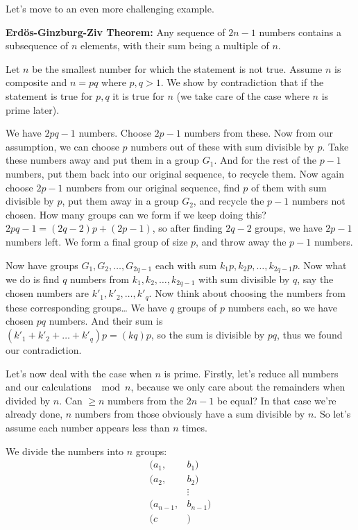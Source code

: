 \documentclass[a4paper,10pt]{article}
\theoremstyle{definition} %
\begin{document}
    Let's move to an even more challenging example.

    \textbf{Erd\"{o}s-Ginzburg-Ziv Theorem: }Any sequence of $2n-1$ numbers contains a 
    subsequence of $n$ elements, with their sum being a multiple of $n$. 

    Let $n$ be the smallest number for which the statement is not true. Assume $n$ is 
    composite and $n = pq$ where $p,q > 1$. We show by contradiction that if the statement
    is true for $p, q$ it is true for $n$ (we take care of the case where $n$ is prime later).

    We have $2pq-1$ numbers. Choose $2p-1$ numbers from these. Now from our assumption,
    we can choose $p$ numbers out of these with sum divisible by $p$. Take these numbers
    away and put them in a group $G_{1}$. And for the rest of the $p-1$ numbers, put them
    back into our original sequence, to recycle them. Now again choose $2p-1$ numbers from
    our original sequence, find $p$ of them with sum divisible by $p$, put them away in a 
    group $G_{2}$, and recycle the $p-1$ numbers not chosen. How many groups can we form if 
    we keep doing this? $2pq-1 = (2q-2)p + (2p-1)$, so after finding $2q-2$ groups, we have
    $2p-1$ numbers left. We form a final group of size $p$, and throw away the $p-1$ numbers.

    Now have groups $G_{1}, G_{2}, \dots, G_{2q-1}$ each with sum $k_{1}p, k_{2}p, 
    \dots, k_{2q-1}p$. Now what we do is find $q$ numbers from $k_{1}, k_{2}, \dots,
    k_{2q-1}$ with sum divisible by $q$, say the chosen numbers are $k'_{1}, k'_{2},
    \dots, k'_{q}$. Now think about choosing the numbers from these corresponding groups\dots
    We have $q$ groups of $p$ numbers each, so we have chosen $pq$ numbers. And their
    sum is \\
    $(k'_{1} + k'_{2} + \dots + k'_{q})p = (kq)p$, so the sum is divisible by
    $pq$, thus we found our contradiction. 

    Let's now deal with the case when $n$ is prime. Firstly, let's reduce all numbers
    and our calculations $\mod n$, because we only care about the remainders when
    divided by $n$. Can $\geq n$ numbers from the $2n-1$ be equal? In that case we're
    already done, $n$ numbers from those obviously have a sum divisible by $n$. So let's
    assume each number appears less than $n$ times.
    
    We divide the numbers into $n$ groups: 
    \begin{align*}
        (a_1, &b_1) \\
        (a_2, &b_2) \\
        &\vdots \\
        (a_{n-1}, &b_{n-1}) \\
        (c &)
    \end{align*}
\end{document}
